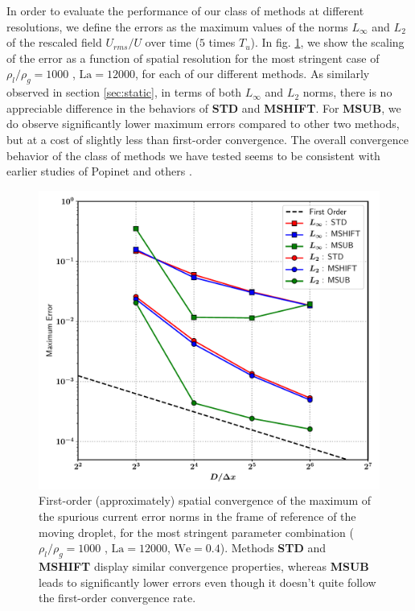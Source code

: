 In order to evaluate the performance of our class of methods at different resolutions, we define the errors as the maximum values of the norms $L_\infty$ and $L_2$ of the rescaled field $U_{rms}/U$ over time ($5$ times $T_u$). In fig. \ref{moving_drop_conv}, we show the scaling of the error as a function of spatial resolution for the most stringent case of $\rho_l/\rho_g = 1000 $ , $\textrm{La} = 12000$, for each of our different methods. As similarly observed in section \ref{sec:static}, in terms of both $L_\infty$ and $L_2$ norms, there is no appreciable difference in the behaviors of \textbf{STD} and \textbf{MSHIFT}. For \textbf{MSUB}, we do observe significantly lower maximum errors compared to other two methods, but at a cost of slightly less than first-order convergence. The overall convergence behavior of the class of methods we have tested seems to be consistent with earlier studies of Popinet \cite{popinet2009accurate} and others  .  

\begin{figure}[h!]
    \centering
    \includegraphics[width = 1.0\textwidth]{plots/droplet_advect/convergence.pdf}
	\caption{First-order (approximately) spatial convergence of the maximum of the spurious current error norms in the frame of reference of the moving droplet, for the most stringent parameter combination ($\rho_l/\rho_g = 1000 $ , $\textrm{La} = 12000$, $\textrm{We} = 0.4$). Methods \textbf{STD} and \textbf{MSHIFT} display similar convergence properties, whereas \textbf{MSUB} leads to significantly lower errors even though it doesn't quite follow the first-order convergence rate. }   
    \label{moving_drop_conv}
\end{figure}

